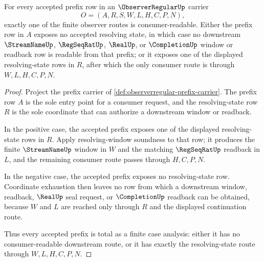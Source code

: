 \begin{theorem}
\label{thm:observerregular-prefix-resolution-totality}
For every accepted prefix row in an $\ObserverRegularUp$ carrier
$$
O=(A,R,S,W,L,H,C,P,N),
$$
exactly one of the finite observer routes is consumer-readable. Either the prefix row in $A$ exposes no accepted resolving state, in which case no downstream $\StreamNameUp$, $\RegSeqRatUp$, $\RealUp$, or $\CompletionUp$ window or readback row is readable from that prefix; or it exposes one of the displayed resolving-state rows in $R$, after which the only consumer route is through $W,L,H,C,P,N$.
\end{theorem}
\begin{proof}
Project the prefix carrier of \autoref{def:observerregular-prefix-carrier}. The prefix row $A$ is the sole entry point for a consumer request, and the resolving-state row $R$ is the sole coordinate that can authorize a downstream window or readback.

In the positive case, the accepted prefix exposes one of the displayed resolving-state rows in $R$. Apply resolving-window soundness to that row; it produces the finite $\StreamNameUp$ window in $W$ and the matching $\RegSeqRatUp$ readback in $L$, and the remaining consumer route passes through $H,C,P,N$.

In the negative case, the accepted prefix exposes no resolving-state row. Coordinate exhaustion then leaves no row from which a downstream window, readback, $\RealUp$ seal request, or $\CompletionUp$ readback can be obtained, because $W$ and $L$ are reached only through $R$ and the displayed continuation route.

Thus every accepted prefix is total as a finite case analysis: either it has no consumer-readable downstream route, or it has exactly the resolving-state route through $W,L,H,C,P,N$.
\end{proof}

